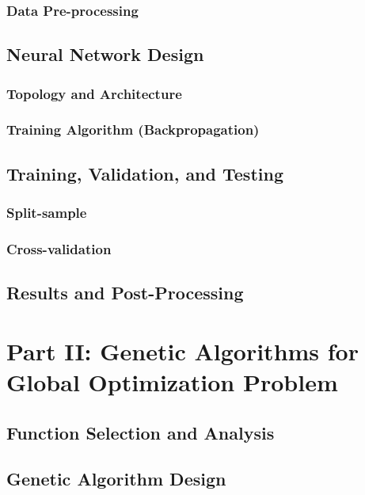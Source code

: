 \documentclass[conference]{inc/IEEEtran}
\begin{document}
\subsubsection{Data Pre-processing}



\subsection{Neural Network Design}

\subsubsection{Topology and Architecture}

\subsubsection{Training Algorithm (Backpropagation)}

\subsection{Training, Validation, and Testing}

\subsubsection{Split-sample}

\subsubsection{Cross-validation}

\subsection{Results and Post-Processing}

\section{Part II: Genetic Algorithms for Global Optimization Problem}

\subsection{Function Selection and Analysis}
\subsection{Genetic Algorithm Design}
\end{document}

